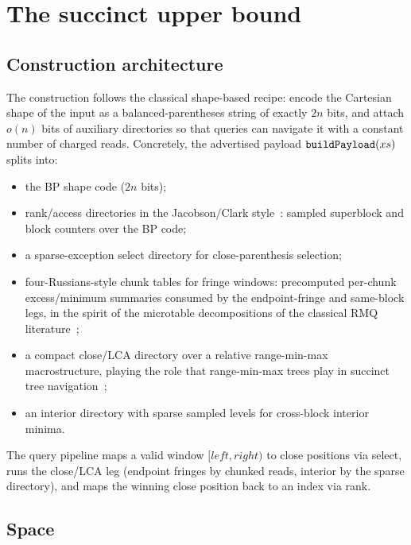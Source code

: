 \documentclass[11pt]{article}
\newcommand{\leanid}[1]{\ifmmode\text{\ttfamily\upshape #1}\else{\def\UrlFont{\ttfamily\upshape}\nolinkurl{#1}}\fi}
\theoremstyle{definition}
\theoremstyle{remark}
\begin{document}
\section{The succinct upper bound}\label{sec:upper}

\subsection{Construction architecture}\label{sec:architecture}

The construction follows the classical shape-based recipe: encode the
Cartesian shape of the input as a balanced-parentheses string of exactly
$2n$ bits, and attach $o(n)$ bits of auxiliary directories so that queries
can navigate it with a constant number of charged reads. Concretely, the
advertised payload $\leanid{buildPayload}(xs)$ splits into:

\begin{itemize}
\item the BP shape code ($2n$ bits);
\item rank/access directories in the Jacobson/Clark
  style~\cite{Jacobson89,Clark96}: sampled superblock and block counters
  over the BP code;
\item a sparse-exception select directory for close-parenthesis selection;
\item four-Russians-style chunk tables for fringe windows: precomputed
  per-chunk excess/minimum summaries consumed by the endpoint-fringe and
  same-block legs, in the spirit of the microtable decompositions of the
  classical RMQ literature~\cite{FischerHeun11};
\item a compact close/LCA directory over a relative range-min-max
  macrostructure, playing the role that range-min-max trees play in
  succinct tree navigation~\cite{NavarroSadakane14,MunroRaman01};
\item an interior directory with sparse sampled levels for cross-block
  interior minima.
\end{itemize}

The query pipeline maps a valid window $[\mathit{left},\mathit{right})$ to
close positions via select, runs the close/LCA leg (endpoint fringes by
chunked reads, interior by the sparse directory), and maps the winning
close position back to an index via rank.

\subsection{Space}\label{sec:space}
\end{document}
